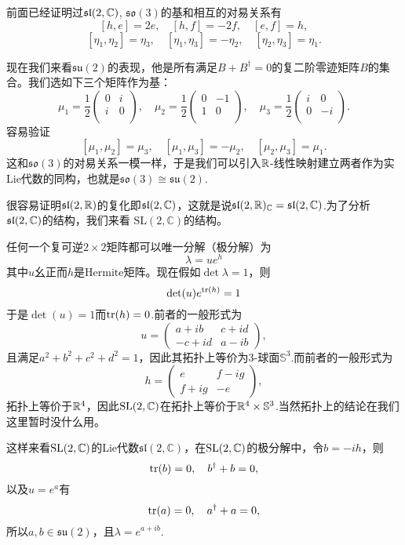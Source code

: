 前面已经证明过$\mathfrak{sl}(2,\mathbb{C})$, $\mathfrak{so}(3)$的基和相互的对易关系有
\[
[h,e]=2e,\quad[h,f]=-2f,\quad[e,f]=h,
\]
\[
	[\eta_1,\eta_2]=\eta_3,\quad [\eta_1,\eta_3]=-\eta_2,\quad [\eta_2,\eta_3]=\eta_1.
\]

现在我们来看$\mathfrak{su}(2)$的表现，他是所有满足$B+B^\dag=0$的复二阶零迹矩阵$B$的集合。我们选如下三个矩阵作为基：
\[
\mu_1=\frac{1}{2}\begin{pmatrix}
	0&i\\
	i&0\\
\end{pmatrix},\quad
\mu_2=\frac{1}{2}\begin{pmatrix}
	0&-1\\
	1&0\\
\end{pmatrix},\quad
\mu_3=\frac{1}{2}\begin{pmatrix}
	i&0\\
	0&-i\\
\end{pmatrix}.
\]
容易验证
\[
[\mu_1,\mu_2]=\mu_3,\quad [\mu_1,\mu_3]=-\mu_2,\quad [\mu_2,\mu_3]=\mu_1.
\]
这和$\mathfrak{so}(3)$的对易关系一模一样，于是我们可以引入$\mathbb{R}$-线性映射建立两者作为实Lie代数的同构，也就是$\mathfrak{so}(3)\cong \mathfrak{su}(2)$.

很容易证明$\mathfrak{sl}(2,\mathbb{R})$的复化即$\mathfrak{sl}(2,\mathbb{C})$，这就是说$\mathfrak{sl}(2,\mathbb{R})_{\mathbb{C}}=\mathfrak{sl}(2,\mathbb{C})$.为了分析$\mathfrak{sl}(2,\mathbb{C})$的结构，我们来看
$\mathrm{SL}(2,\mathbb{C})$的结构。

任何一个复可逆$2\times 2$矩阵都可以唯一分解（极分解）为
\[
\lambda=ue^{h}
\]
其中$u$幺正而$h$是Hermite矩阵。现在假如$\det \lambda=1$，则
\[
\det(u)e^{\operatorname{tr}(h)}=1
\]
于是$\det(u)=1$而$\operatorname{tr}(h)=0$.前者的一般形式为
\[
u=
\begin{pmatrix}
a+ib&c+id\\
-c+id&a-ib
\end{pmatrix},
\]
且满足$a^2+b^2+c^2+d^2=1$，因此其拓扑上等价为3-球面$\mathbb{S}^3$.而前者的一般形式为
\[
h=\begin{pmatrix}
e&f-ig\\
f+ig&-e
\end{pmatrix},
\]
拓扑上等价于$\mathbb{R}^4$，因此$\mathrm{SL}(2,\mathbb{C})$在拓扑上等价于$\mathbb{R}^4\times \mathbb{S}^3$.当然拓扑上的结论在我们这里暂时没什么用。

这样来看$\mathrm{SL}(2,\mathbb{C})$的Lie代数$\mathfrak{sl}(2,\mathbb{C})$，在$\mathrm{SL}(2,\mathbb{C})$的极分解中，令$b=-ih$，则
\[
\operatorname{tr}(b)=0,\quad b^\dag+b=0,
\]
以及$u=e^a$有
\[
\operatorname{tr}(a)=0,\quad a^\dag+a=0,
\]
所以$a,b\in\mathfrak{su}(2)$，且$\lambda=e^{a+ib}$.

